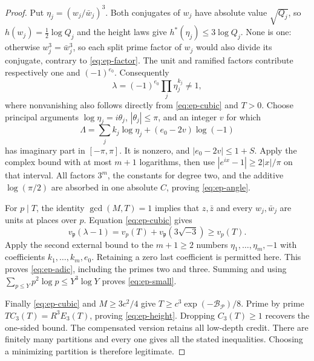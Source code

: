 \begin{proof}
Put $\eta_j=(w_j/\bar w_j)^3$. Both conjugates of $w_j$ have absolute value
$\sqrt{Q_j}$, so $h(w_j)=\tfrac12\log Q_j$ and the height laws give
$h^*(\eta_j)\le3\log Q_j$. None is one: otherwise $w_j^3=\bar w_j^3$,
so each split prime factor of $w_j$ would also divide its conjugate, contrary
to \eqref{eq:ep-factor}. The unit and ramified factors contribute respectively
one and $(-1)^{e_0}$. Consequently
\[
 \lambda=(-1)^{e_0}\prod_j\eta_j^{k_j}\ne1,
\]
where nonvanishing also follows directly from \eqref{eq:ep-cubic} and $T>0$.
Choose principal arguments $\log\eta_j=i\theta_j$, $|\theta_j|\le\pi$, and
an integer $v$ for which
\[
 \Lambda=\sum_j k_j\log\eta_j+(e_0-2v)\log(-1)
\]
has imaginary part in $[-\pi,\pi]$. It is nonzero, and
$|e_0-2v|\le1+S$. Apply the complex bound with at most $m+1$ logarithms,
then use $|e^{ix}-1|\ge2|x|/\pi$ on that interval. All factors $3^m$,
the constants for degree two, and the additive $\log(\pi/2)$ are absorbed
in one absolute $C$, proving \eqref{eq:ep-angle}.

For $p\mid T$, the identity $\gcd(M,T)=1$ implies that $z,\bar z$ and every
$w_j,\bar w_j$ are units at places over $p$. Equation \eqref{eq:ep-cubic}
gives
\[
 v_{\mathfrak p}(\lambda-1)
 =v_p(T)+v_{\mathfrak p}(3\sqrt{-3})\ge v_p(T).
\]
Apply the second external bound to the $m+1\ge2$ numbers
$\eta_1,\ldots,\eta_m,-1$ with coefficients $k_1,\ldots,k_m,e_0$.
Retaining a zero last coefficient is permitted here. This proves
\eqref{eq:ep-adic}, including the primes two and three. Summing and using
$\sum_{p\le Y}p^2\log p\le Y^3\log Y$ proves \eqref{eq:ep-small}.

Finally \eqref{eq:ep-cubic} and $M\ge3c^2/4$ give
$T\ge c^3\exp(-\mathcal B_{\mathcal P})/8$.
Prime by prime $T C_3(T)=R^3E_3(T)$, proving
\eqref{eq:ep-height}. Dropping $C_3(T)\ge1$ recovers the one-sided
bound. The compensated version retains all low-depth credit.
There are finitely many partitions and every one gives all the stated
inequalities. Choosing a minimizing partition is therefore legitimate.
\end{proof}

